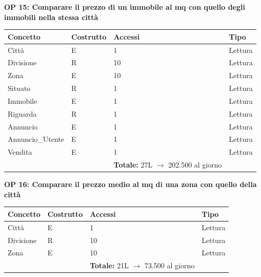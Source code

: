 \documentclass[a4paper,12pt]{report}
\begin{document}
            \textbf{OP 15: Comparare il prezzo di un immobile al mq con quello degli immobili nella stessa città}
        	\begin{table}[H]
            \centering
             \begin{tabular}{llll}
             \rowcolor{yellow!20} \textbf{Concetto} & \textbf{Costrutto} & \textbf{Accessi} & \textbf{Tipo}\\ [0.5ex] 
             \hline
             Città & E & 1 & Lettura \\ 
             Divisione & R & 10 & Lettura \\ 
             Zona & E & 10 & Lettura \\ 
             Situato & R & 1 & Lettura \\ 
             Immobile & E & 1 & Lettura \\ 
             Riguarda & R & 1 & Lettura \\ 
             Annuncio & E & 1 & Lettura \\ 
             Annuncio\_Utente & E & 1 & Lettura \\ 
             Vendita & E & 1 & Lettura \\ 

             \hline
                \rowcolor{yellow!20} &   & \textbf{Totale:} 27L $\rightarrow$ 202.500 al giorno &  \\ [1ex] 
             
             \end{tabular}
            \end{table}
            
            \textbf{OP 16: Comparare il prezzo medio al mq di una zona con quello della città}
        	\begin{table}[H]
            \centering
             \begin{tabular}{llll}
             \rowcolor{yellow!20} \textbf{Concetto} & \textbf{Costrutto} & \textbf{Accessi} & \textbf{Tipo}\\ [0.5ex] 
             \hline
             Città & E & 1 & Lettura \\ 
             Divisione & R & 10 & Lettura \\ 
             Zona & E & 10 & Lettura \\ 
             \hline
                \rowcolor{yellow!20} &   & \textbf{Totale:} 21L $\rightarrow$ 73.500 al giorno &  \\ [1ex] 
             
             \end{tabular}
            \end{table}
\end{document}
